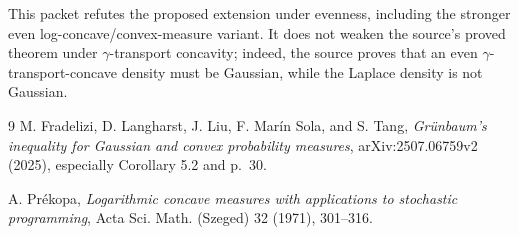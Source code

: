 \documentclass[11pt,a4paper]{article}
\begin{document}
This packet refutes the proposed extension under evenness, including the
stronger even log-concave/convex-measure variant.  It does not weaken the
source's proved theorem under $\gamma$-transport concavity; indeed, the source
proves that an even $\gamma$-transport-concave density must be Gaussian, while
the Laplace density is not Gaussian.

\begin{thebibliography}{9}
M. Fradelizi, D. Langharst, J. Liu, F. Mar\'in Sola, and S. Tang,
\emph{Gr\"unbaum's inequality for Gaussian and convex probability measures},
arXiv:2507.06759v2 (2025), especially Corollary 5.2 and p.~30.

A. Pr\'ekopa,
\emph{Logarithmic concave measures with applications to stochastic
programming}, Acta Sci. Math. (Szeged) 32 (1971), 301--316.
\end{thebibliography}
\end{document}
